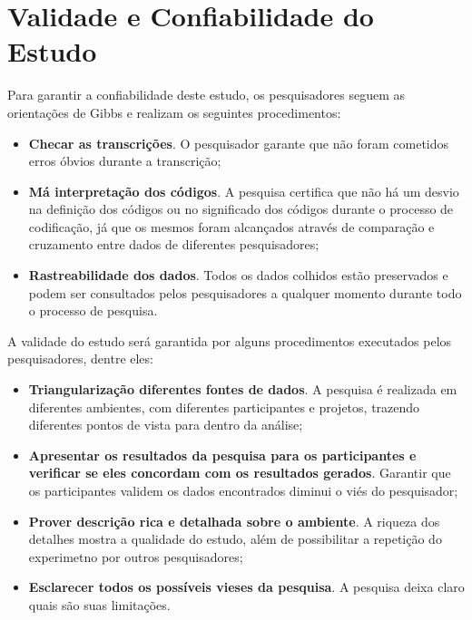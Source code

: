 \section{Validade e Confiabilidade do Estudo}
\label{sec:planejamento-validacao}

Para garantir a confiabilidade deste estudo, os pesquisadores seguem as
orientações de Gibbs \cite{gibbs} e realizam os seguintes procedimentos:

\begin{itemize}
	\item \textbf{Checar as transcrições}. O pesquisador garante que não foram
	cometidos erros óbvios durante a transcrição;

	\item \textbf{Má interpretação dos códigos}. A pesquisa certifica que não há um
	desvio na definição dos códigos ou no significado dos códigos durante o processo 
	de codificação, já que os mesmos foram alcançados através de comparação e
	cruzamento entre dados de diferentes pesquisadores;
	
	\item \textbf{Rastreabilidade dos dados}. Todos os dados colhidos estão
	preservados e podem ser consultados pelos pesquisadores a qualquer momento
	durante todo o processo de pesquisa.

\end{itemize}

A validade do estudo será garantida por alguns procedimentos executados pelos
pesquisadores, dentre eles:

\begin{itemize}
	\item \textbf{Triangularização diferentes fontes de dados}. A pesquisa é
	realizada em diferentes ambientes, com diferentes participantes e projetos,
	trazendo diferentes pontos de vista para dentro da análise;

	\item \textbf{Apresentar os resultados da pesquisa para os participantes e
	verificar se eles concordam com os resultados gerados}. Garantir que os
	participantes validem os dados encontrados diminui o viés do pesquisador;

	\item \textbf{Prover descrição rica e detalhada sobre o ambiente}. A riqueza
	dos detalhes mostra a qualidade do estudo, além de possibilitar a repetição do
	experimetno por outros pesquisadores;

	\item \textbf{Esclarecer todos os possíveis vieses da pesquisa}. A pesquisa
	deixa claro quais são suas limitações.

\end{itemize}

